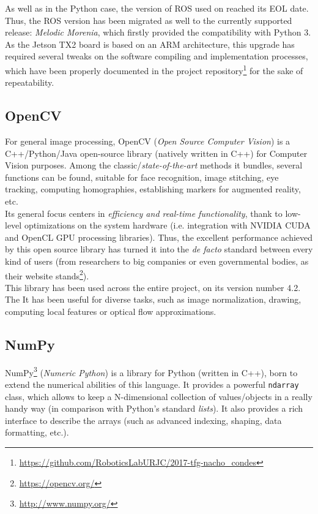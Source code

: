 As well as in the Python case, the version of ROS used on \cite{tfg} reached its EOL date. Thus, the ROS version has been migrated as well to the currently supported release: \textit{Melodic Morenia}, which firstly provided the compatibility with Python 3. As the Jetson TX2 board is based on an ARM architecture, this upgrade has required several tweaks on the software compiling and implementation processes, which have been properly documented in the project repository\footnote{\url{https://github.com/RoboticsLabURJC/2017-tfg-nacho_condes}} for the sake of repeatability.\\


\subsection{OpenCV}
For general image processing, OpenCV (\emph{Open Source Computer Vision}) is a C++/Python/Java open-source library (natively written in C++) for Computer Vision purposes. Among the classic/\emph{state-of-the-art} methods it bundles, several functions can be found, suitable for face recognition, image stitching, eye tracking, computing homographies, establishing markers for augmented reality, etc.\\

Its general focus centers in \emph{efficiency and real-time functionality}, thank to low-level optimizations on the system hardware (i.e. integration with NVIDIA CUDA and OpenCL GPU processing libraries). Thus, the excellent performance achieved by this open source library has turned it into the \emph{de facto} standard between every kind of users (from researchers to big companies or even governmental bodies, as their website stands\footnote{\url{https://opencv.org/}}).\\

This library has been used across the entire project, on its version number 4.2. The It has been useful for diverse tasks, such as image normalization, drawing, computing local features or optical flow approximations.


\subsection{NumPy}

NumPy\footnote{\url{http://www.numpy.org/}} (\emph{Numeric Python}) is a library for Python (written in C++), born to extend the numerical abilities of this language. It provides a powerful \texttt{ndarray} class, which allows to keep a N-dimensional collection of values/objects in a really handy way (in comparison with Python's standard \emph{lists}). It also provides a rich interface to describe the arrays (such as advanced indexing, shaping, data formatting, etc.).\\


